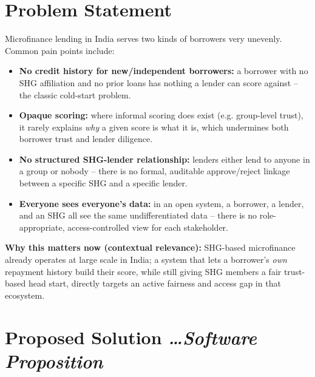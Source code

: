 \documentclass[11pt,a4paper]{article}
\newcommand{\BvrHint}[1]{%
  {\normalfont\normalsize\itshape\hfill #1}}
\begin{document}
\section{Problem Statement}
Microfinance lending in India serves two kinds of
borrowers very unevenly. Common pain points include:
\begin{itemize}[leftmargin=0.7cm]
    \item \textbf{No credit history for new/independent
    borrowers:} a borrower with no SHG affiliation and no
    prior loans has nothing a lender can score against --
    the classic cold-start problem.
    \item \textbf{Opaque scoring:} where informal scoring
    does exist (e.g. group-level trust), it rarely
    explains \emph{why} a given score is what it is, which
    undermines both borrower trust and lender diligence.
    \item \textbf{No structured SHG-lender relationship:}
    lenders either lend to anyone in a group or nobody --
    there is no formal, auditable approve/reject linkage
    between a specific SHG and a specific lender.
    \item \textbf{Everyone sees everyone's data:} in an
    open system, a borrower, a lender, and an SHG all see
    the same undifferentiated data -- there is no
    role-appropriate, access-controlled view for each
    stakeholder.
\end{itemize}

\textbf{Why this matters now (contextual relevance):} SHG-based
microfinance already operates at large scale in India; a
system that lets a borrower's \emph{own} repayment history
build their score, while still giving SHG members a fair
trust-based head start, directly targets an active
fairness and access gap in that ecosystem.

\section{Proposed Solution %
\BvrHint{\ldots Software Proposition}}
\end{document}
